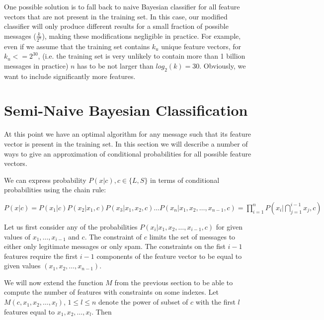 \documentclass[12pt]{report}
\makeatletter
\renewcommand{\subsection}{\@startsection{subsection}{2}{0mm}{-\baselineskip}{-5pt}{\bf}}
\makeatother
\begin{document}
One possible solution is to fall back to naive Bayesian classifier for all feature vectors that are not present in the training set. In this case, our modified classifier will only produce different results for a small fraction of possible messages ($\frac{k}{2^n}$), making these modifications negligible in practice. For example, even if we assume that the training set contains $k_u$ unique feature vectors, for $k_u <= 2^30$, (i.e. the training set is very unlikely to contain more than 1 billion messages in practice) $n$ has to be not larger than $log_2(k) = 30$. Obviously, we want to include significantly more features.

\newpage

\section{Semi-Naive Bayesian Classification}

At this point we have an optimal algorithm for any message such that its feature vector is present in the training set. In this section we will describe a number of ways to give an approximation of conditional probabilities for all possible feature vectors.

\subsection{Chain rule}

We can express probability $P(x | c), c \in \{L, S\}$ in terms of conditional probabilities using the chain rule:

\begin{center}
	$P(x | c) = P(x_1 | c) P(x_2 | x_1, c) P(x_3 | x_1, x_2, c) \dots P(x_n | x_1, x_2, \dots, x_{n - 1}, c) = \prod_{i=1}^{n}P(x_i | \bigcap_{j = 1}^{i - 1} x_j, c)$
\end{center}

Let us first consider any of the probabilities $P(x_i | x_1, x_2, \dots, x_{i-1}, c)$ for given values of $x_1, \dots, x_{i - 1}$ and $c$. The constraint of $c$ limits the set of messages to either only legitimate messages or only spam. The constraints on the fist $i - 1$ features require the first $i - 1$ components of the feature vector to be equal to given values $(x_1, x_2, \dots, x_{n-1})$.

We will now extend the function $M$ from the previous section to be able to compute the number of features with constraints on some indexes. Let $M(c, x_1, x_2, \dots, x_l)$, $1 \leq l \leq n$ denote the power of subset of $c$ with the first $l$ features equal to $x_1, x_2, \dots, x_l$. Then
\end{document}
